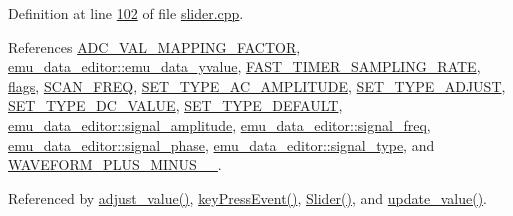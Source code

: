 Definition at line \hyperlink{a00046_source_l00102}{102} of file \hyperlink{a00046_source}{slider.\+cpp}.



References \hyperlink{a00031_source_l00075}{A\+D\+C\+\_\+\+V\+A\+L\+\_\+\+M\+A\+P\+P\+I\+N\+G\+\_\+\+F\+A\+C\+T\+O\+R}, \hyperlink{a00036_source_l00045}{emu\+\_\+data\+\_\+editor\+::emu\+\_\+data\+\_\+yvalue}, \hyperlink{a00031_source_l00024}{F\+A\+S\+T\+\_\+\+T\+I\+M\+E\+R\+\_\+\+S\+A\+M\+P\+L\+I\+N\+G\+\_\+\+R\+A\+T\+E}, \hyperlink{a00024_ade6449558d429b66e5ed1381bc9b9060}{flags}, \hyperlink{a00031_source_l00022}{S\+C\+A\+N\+\_\+\+F\+R\+E\+Q}, \hyperlink{a00034_source_l00046}{S\+E\+T\+\_\+\+T\+Y\+P\+E\+\_\+\+A\+C\+\_\+\+A\+M\+P\+L\+I\+T\+U\+D\+E}, \hyperlink{a00034_source_l00049}{S\+E\+T\+\_\+\+T\+Y\+P\+E\+\_\+\+A\+D\+J\+U\+S\+T}, \hyperlink{a00034_source_l00045}{S\+E\+T\+\_\+\+T\+Y\+P\+E\+\_\+\+D\+C\+\_\+\+V\+A\+L\+U\+E}, \hyperlink{a00034_source_l00048}{S\+E\+T\+\_\+\+T\+Y\+P\+E\+\_\+\+D\+E\+F\+A\+U\+L\+T}, \hyperlink{a00036_source_l00042}{emu\+\_\+data\+\_\+editor\+::signal\+\_\+amplitude}, \hyperlink{a00036_source_l00040}{emu\+\_\+data\+\_\+editor\+::signal\+\_\+freq}, \hyperlink{a00036_source_l00041}{emu\+\_\+data\+\_\+editor\+::signal\+\_\+phase}, \hyperlink{a00036_source_l00039}{emu\+\_\+data\+\_\+editor\+::signal\+\_\+type}, and \hyperlink{a00034_source_l00040}{W\+A\+V\+E\+F\+O\+R\+M\+\_\+\+P\+L\+U\+S\+\_\+\+M\+I\+N\+U\+S\+\_\+\_}.



Referenced by \hyperlink{a00046_source_l00069}{adjust\+\_\+value()}, \hyperlink{a00046_source_l00219}{key\+Press\+Event()}, \hyperlink{a00046_source_l00014}{Slider()}, and \hyperlink{a00046_source_l00088}{update\+\_\+value()}.


